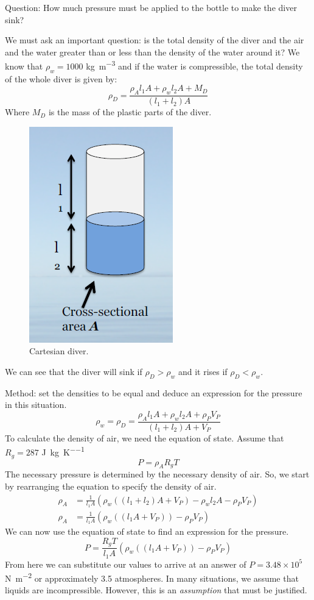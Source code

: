 \documentclass[class=report, crop=false, 12pt,a4paper]{standalone}
\numberwithin{equation}{section}
\begin{document}
Question: How much pressure must be applied to the bottle to make the diver sink?

We must ask an important question: is the total density of the diver and the air and the water greater than or less than the density of the water around it? We know that \( \rho_w = 1000\) \si{kg\per\meter\cubed} and if the water is compressible, the total density of the whole diver is given by:
\begin{equation} 
  \rho_D = \frac{\rho_A l_1 A + \rho_w l_2 A + M_D}{(l_1 + l_2)A} 
\end{equation}
Where \(M_D\) is the mass of the plastic parts of the diver. 
\begin{figure}[h!]
  \centering
  \includegraphics[width = 0.4 \textwidth]{../img/CartesianDiver}
  \caption{Cartesian diver.}
\end{figure}
We can see that the diver will sink if \(\rho_D > \rho_w\) and it rises if \(\rho_D < \rho_w\).

Method: set the densities to be equal and deduce an expression for the pressure in this situation. 
\begin{equation} 
  \rho_w = \rho_D = \frac{\rho_A l_1 A + \rho_w l_2 A + \rho_P V_P}{(l_1 + l_2)A + V_P} 
\end{equation}
To calculate the density of air, we need the equation of state. Assume that \( R_g = 287\) \si{\joule\per\kg\per\kelvin}
\begin{equation} 
  P = \rho_A R_g T
\end{equation}
The necessary pressure is determined by the necessary density of air. So, we start by rearranging the equation to specify the density of air. 
\begin{align}
 \rho_A &= \frac{1}{l_1 A} \left( \rho_w \left( (l_1 + l_2)A + V_P \right) - \rho_w l_2 A - \rho_P V_P \right) \\
 \rho_A &= \frac{1}{l_1 A} \left( \rho_w \left( (l_1A + V_P) \right) -\rho_P V_P \right) 
\end{align}
We can now use the equation of state to find an expression for the pressure. 
\begin{equation} 
  P = \frac{R_g T}{l_1 A} \left( \rho_w \left( (l_1A + V_P) \right) -\rho_P V_P \right) 
\end{equation}
From here we can substitute our values to arrive at an answer of \( P = 3.48 \times 10^5\) \si{\newton\per\meter\squared} or approximately 3.5 atmospheres. In many situations, we assume that liquids are incompressible. However, this is an \emph{assumption} that must be justified. 
\end{document}
